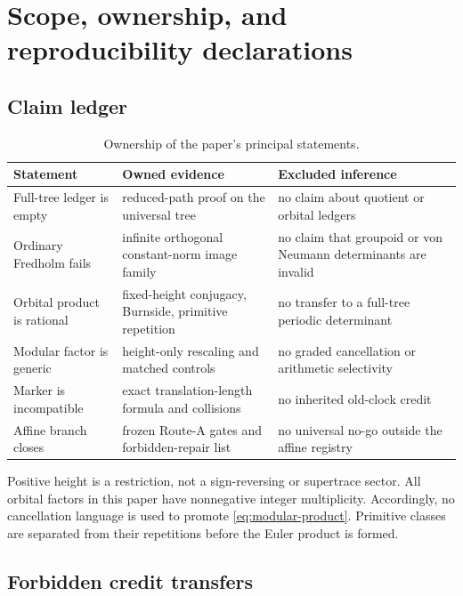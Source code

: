 \section{Scope, ownership, and reproducibility declarations}
\label{app:scope}
\footnotesize
\enlargethispage{\baselineskip}

\subsection{Claim ledger}

\begin{table}[H]
\centering
\small
\caption{Ownership of the paper's principal statements.}
\label{tab:claim-ownership}
\begin{tabularx}{\textwidth}{L{2.8cm}YL{3.8cm}}
\toprule
Statement & Owned evidence & Excluded inference \\
\midrule
Full-tree ledger is empty & reduced-path proof on the universal tree & no
claim about quotient or orbital ledgers \\
Ordinary Fredholm fails & infinite orthogonal constant-norm image family &
no claim that groupoid or von Neumann determinants are invalid \\
Orbital product is rational & fixed-height conjugacy, Burnside, primitive
repetition & no transfer to a full-tree periodic determinant \\
Modular factor is generic & height-only rescaling and matched controls & no
graded cancellation or arithmetic selectivity \\
Marker is incompatible & exact translation-length formula and collisions &
no inherited old-clock credit \\
Affine branch closes & frozen Route-A gates and forbidden-repair list & no
universal no-go outside the affine registry \\
\bottomrule
\end{tabularx}
\end{table}

Positive height is a restriction, not a sign-reversing or supertrace sector.
All orbital factors in this paper have nonnegative integer multiplicity.
Accordingly, no cancellation language is used to promote
\eqref{eq:modular-product}.  Primitive classes are separated from their
repetitions before the Euler product is formed.

\subsection{Forbidden credit transfers}

